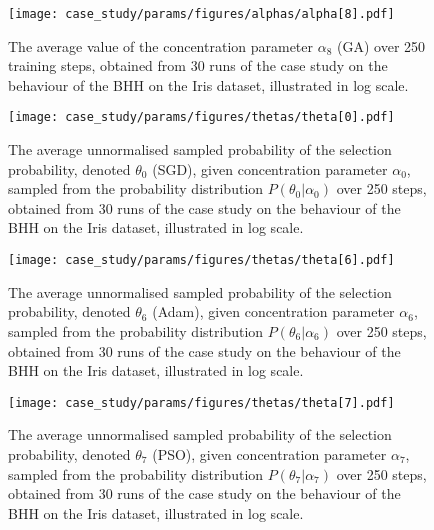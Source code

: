 \begin{figure}[htpb]
	\centering
	\texttt{[image: case\_study/params/figures/alphas/alpha[8].pdf]}
	\caption{The average value of the concentration parameter $\alpha_{8}$ (\acs{GA}) over 250 training steps, obtained from 30 runs of the case study on the behaviour of the \acs{BHH} on the Iris dataset, illustrated in log scale.}
	\label{fig:results:case_study:alpha:8}
\end{figure}




\begin{figure}[htpb]
	\centering
	\texttt{[image: case\_study/params/figures/thetas/theta[0].pdf]}
	\caption{The average unnormalised sampled probability of the selection probability, denoted $\theta_{0}$ (\acs{SGD}), given concentration parameter $\alpha_{0}$, sampled from the probability distribution $P(\theta_{0} \vert \alpha_{0})$ over 250 steps, obtained from 30 runs of the case study on the behaviour of the \acs{BHH} on the Iris dataset, illustrated in log scale.}
	\label{fig:results:case_study:theta:0}
\end{figure}

\begin{figure}[htpb]
	\centering
	\texttt{[image: case\_study/params/figures/thetas/theta[6].pdf]}
	\caption{The average unnormalised sampled probability of the selection probability, denoted $\theta_{6}$ (\acs{Adam}), given concentration parameter $\alpha_{6}$, sampled from the probability distribution $P(\theta_{6} \vert \alpha_{6})$ over 250 steps, obtained from 30 runs of the case study on the behaviour of the \acs{BHH} on the Iris dataset, illustrated in log scale.}
	\label{fig:results:case_study:theta:6}
\end{figure}

\begin{figure}[htpb]
	\centering
	\texttt{[image: case\_study/params/figures/thetas/theta[7].pdf]}
	\caption{The average unnormalised sampled probability of the selection probability, denoted $\theta_{7}$ (\acs{PSO}), given concentration parameter $\alpha_{7}$, sampled from the probability distribution $P(\theta_{7} \vert \alpha_{7})$ over 250 steps, obtained from 30 runs of the case study on the behaviour of the \acs{BHH} on the Iris dataset, illustrated in log scale.}
	\label{fig:results:case_study:theta:7}
\end{figure}

